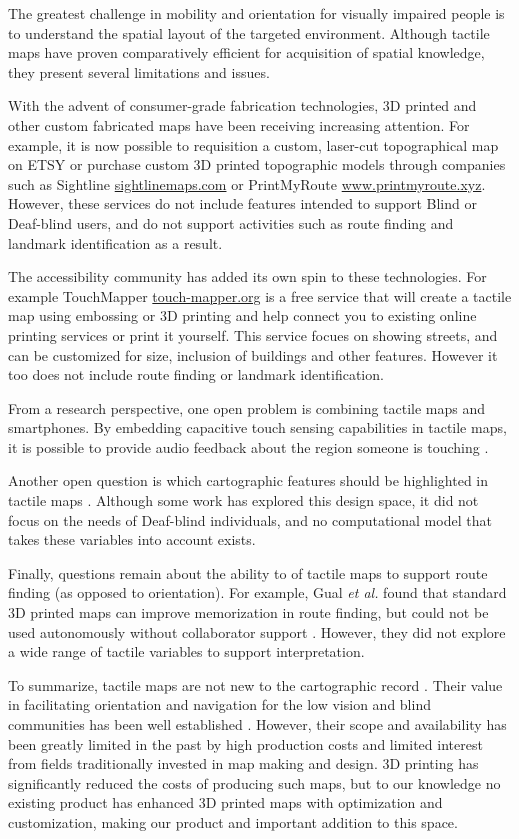 The greatest challenge in mobility and orientation for visually impaired people is to understand the spatial layout of the targeted environment. 
Although  tactile  maps  have proven comparatively efficient  for  acquisition  of  spatial  knowledge,  they  present  several limitations  and  issues.

With the advent of consumer-grade fabrication technologies, 3D printed and other custom fabricated maps have been receiving increasing attention. For example, it is now possible to requisition a custom, laser-cut topographical map on ETSY \cite{etsy} or purchase custom 3D printed topographic models through companies such as Sightline \url{sightlinemaps.com} or PrintMyRoute \url{www.printmyroute.xyz}. However, these services do not include features intended to support Blind or Deaf-blind users, and do not support activities such as route finding and landmark identification as a result. 

The accessibility community has added its own spin to these technologies. For example TouchMapper \url{touch-mapper.org} is a free service that will create a tactile map using embossing or 3D printing and help connect you to existing online printing services or print it yourself.  This service focues on showing streets, and can be customized for size, inclusion of buildings and other features. However it too does not include route finding or landmark identification. 

From a research perspective, one open problem is combining tactile maps and smartphones. By embedding capacitive touch sensing capabilities in tactile maps, it is possible to provide audio feedback about the region someone is touching \cite{taylor2016customizable, rusu2010semantic,gotzelmann2016lucentmaps}. 

Another open question is which cartographic features should be highlighted in tactile maps \cite{haberling2008proposed}. Although some work has explored this design space, it did not focus on the needs of Deaf-blind individuals, and no computational model that takes these variables into account exists.

Finally, questions remain about the ability to of tactile maps to support route finding (as opposed to orientation). For example, Gual \textit{et al.} found that standard 3D printed maps can improve memorization in route finding, but could not be used autonomously without collaborator support \cite{gual2012visual}. However, they did not explore a wide range of tactile variables to support interpretation. 

To summarize, tactile maps are not new to the cartographic record \cite{xx}. Their value in facilitating orientation and navigation for the low vision and blind communities has been well established \cite{XXX}. However, their scope and availability has been greatly limited in the past by high production costs and limited interest from fields traditionally invested in map making and design.  3D printing has significantly reduced the costs of producing such maps, but to our knowledge no existing product has enhanced 3D printed maps with optimization and customization, making our product and important addition to this space. 

